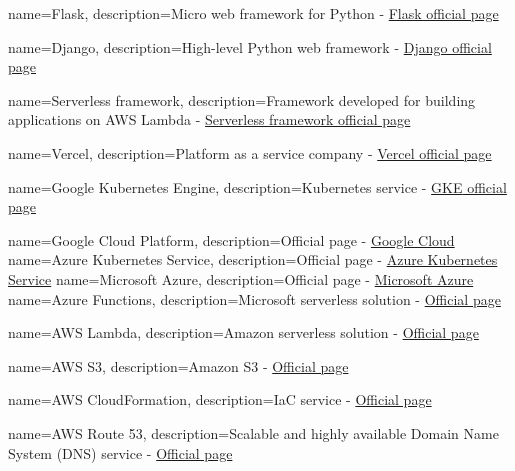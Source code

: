 {
        name=Flask,
        description={Micro web framework for Python  - \href{https://flask.palletsprojects.com/en/3.0.x/}{Flask official page}}
}

{
        name=Django,
        description={High-level Python web framework - \href{https://www.djangoproject.com}{Django official page}}
}

{
        name=Serverless framework,
        description={Framework developed for building applications on AWS Lambda - \href{https://www.serverless.com}{Serverless framework official page}}
}

{
        name=Vercel,
        description={Platform as a service company - \href{https://vercel.com}{Vercel official page}}
}

{
        name=Google Kubernetes Engine,
        description={Kubernetes service - \href{https://cloud.google.com/kubernetes-engine}{\ac{GKE} official page}}
}

{
        name=Google Cloud Platform,
        description={Official page - \href{https://cloud.google.com}{Google Cloud}}
}
{
        name=Azure Kubernetes Service,
        description={Official page - \href{https://azure.microsoft.com/products/kubernetes-service}{Azure Kubernetes Service}}
}
{
        name=Microsoft Azure,
        description={Official page - \href{https://azure.microsoft.com}{Microsoft Azure}}
}
{
        name=Azure Functions,
        description={Microsoft serverless solution - \href{https://learn.microsoft.com/en-us/azure/azure-functions/functions-overview?pivots=programming-language-csharp}{Official page}}
}

{
        name=AWS Lambda,
        description={Amazon serverless solution - \href{https://aws.amazon.com/lambda/}{Official page}}
}

{
        name=AWS S3,
        description={Amazon \ac{S3} - \href{https://aws.amazon.com/s3/}{Official page}}
}

{
        name=AWS CloudFormation,
        description={\ac{IaC} service - \href{https://aws.amazon.com/cloudformation/}{Official page}}
}

{
        name=AWS Route 53,
        description={Scalable and highly available Domain Name System (DNS) service - \href{https://aws.amazon.com/route53/}{Official page}}
}

